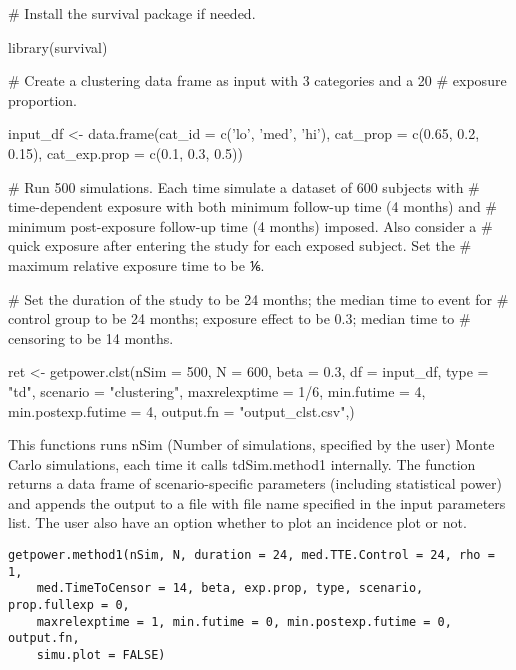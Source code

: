 \documentclass[a4paper]{book}
\begin{document}
\begin{Examples}
\begin{ExampleCode}
# Install the survival package if needed.

library(survival)

# Create a clustering data frame as input with 3 categories and a 20%
# exposure proportion.
  
input_df <- data.frame(cat_id = c('lo', 'med', 'hi'),
	cat_prop = c(0.65, 0.2, 0.15), cat_exp.prop = c(0.1, 0.3, 0.5))

# Run 500 simulations. Each time simulate a dataset of 600 subjects with
# time-dependent exposure with both minimum follow-up time (4 months) and
# minimum post-exposure follow-up time (4 months) imposed. Also consider a
# quick exposure after entering the study for each exposed subject. Set the
# maximum relative exposure time to be ⅙. 

# Set the duration of the study to be 24 months; the median time to event for
# control group to be 24 months; exposure effect to be 0.3; median time to
# censoring to be 14 months.

ret <- getpower.clst(nSim = 500, N = 600, beta = 0.3, df = input_df,
    type = "td", scenario = "clustering", maxrelexptime = 1/6, min.futime = 4,
    min.postexp.futime = 4, output.fn = "output_clst.csv",) 
\end{ExampleCode}
\end{Examples}
%
\begin{Description}\relax

This functions runs nSim (Number of simulations, specified by the user) Monte Carlo simulations, each time it calls
tdSim.method1 internally. The function returns a data frame of scenario-specific parameters (including statistical power) and appends the output to a file with file name specified in the input parameters list. The user also have an option whether to plot an incidence plot or not.
\end{Description}
%
\begin{Usage}
\begin{verbatim}
getpower.method1(nSim, N, duration = 24, med.TTE.Control = 24, rho = 1,
    med.TimeToCensor = 14, beta, exp.prop, type, scenario, prop.fullexp = 0,
    maxrelexptime = 1, min.futime = 0, min.postexp.futime = 0, output.fn, 
    simu.plot = FALSE)
\end{verbatim}
\end{Usage}
\end{document}
